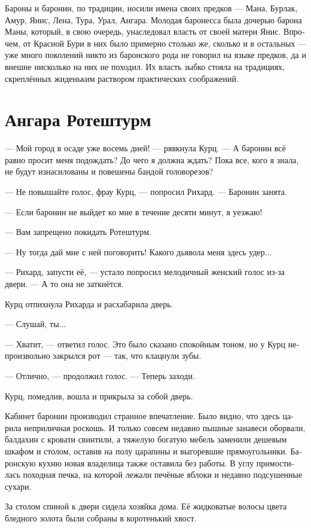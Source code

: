 \documentclass[a4paper,12pt,fleqn]{book}\usepackage{polyglossia}\setdefaultlanguage[babelshorthands=true]{russian}\setotherlanguage{english}\defaultfontfeatures{Ligatures=TeX,Mapping=tex-text}\usepackage{xcolor}\newcommand{\ml}[3]{#2}
\begin{document}
Бароны и баронин, по традиции, носили имена своих предков --- Мана, Бурлак, Амур, Янис, Лена, Тура, Урал, Ангара.
Молодая баронесса была дочерью барона Маны, который, в свою очередь, унаследовал власть от своей матери Янис.
Впрочем, от Красной Бури в них было примерно столько же, сколько и в остальных --- уже много поколений никто из баронского рода не говорил на языке предков, да и внешне нисколько на них не походил.
Их власть зыбко стояла на традициях, скреплённых жиденьким раствором практических соображений.

\section{Ангара Ротештурм}

--- Мой город в осаде уже восемь дней! --- рявкнула Курц.
--- А баронин всё равно просит меня подождать?
До чего я должна ждать?
Пока все, кого я знала, не будут изнасилованы и повешены бандой головорезов?

--- Не повышайте голос, фрау Курц, --- попросил Рихард.
--- Баронин занята. 

--- Если баронин не выйдет ко мне в течение десяти минут, я уезжаю!

--- Вам запрещено покидать Ротештурм.

--- Ну тогда дай мне с ней поговорить!
Какого дьявола меня здесь удер...

--- Рихард, запусти её, --- устало попросил мелодичный женский голос из-за двери.
--- А то она не заткнётся.

Курц отпихнула Рихарда и расхабарила дверь.

--- Слушай, ты...

--- Хватит, --- ответил голос.
Это было сказано спокойным тоном, но у Курц непроизвольно закрылся рот --- так, что клацнули зубы.

--- Отлично, --- продолжил голос.
--- Теперь заходи.

Курц, помедлив, вошла и прикрыла за собой дверь.

Кабинет баронин производил странное впечатление.
Было видно, что здесь царила неприличная роскошь.
И только совсем недавно пышные занавеси оборвали, балдахин с кровати свинтили, а тяжелую богатую мебель заменили дешевым шкафом и столом, оставив на полу царапины и выгоревшие прямоугольники.
Баронскую кухню новая владелица также оставила без работы.
В углу примостилась походная печка, на которой лежали печёные яблоки и недавно подсушенные сухари.

За столом спиной к двери сидела хозяйка дома.
Её жидковатые волосы цвета бледного золота были собраны в коротенький хвост.
\end{document}

